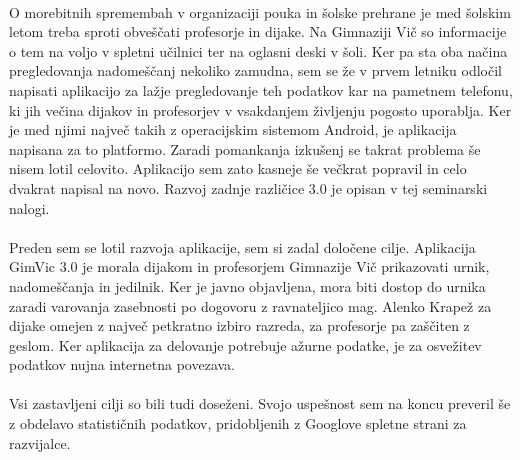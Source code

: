 \paragraph{}O morebitnih spremembah v organizaciji pouka in šolske prehrane je med šolskim letom treba sproti obveščati profesorje in dijake. Na Gimnaziji Vič so informacije o tem na voljo v spletni učilnici ter na oglasni deski v šoli. Ker pa sta oba načina pregledovanja nadomeščanj nekoliko zamudna, sem se že v prvem letniku odločil napisati aplikacijo za lažje pregledovanje teh podatkov kar na pametnem telefonu, ki jih večina dijakov in profesorjev v vsakdanjem življenju pogosto uporablja. Ker je med njimi največ takih z operacijskim sistemom Android\cite{android-wiki}, je aplikacija napisana za to platformo.  Zaradi pomankanja izkušenj se takrat problema še nisem lotil celovito. Aplikacijo sem zato kasneje še večkrat popravil in celo dvakrat napisal na novo. Razvoj zadnje različice 3.0 je opisan v tej seminarski nalogi.

\paragraph{} Preden sem se lotil razvoja aplikacije, sem si zadal določene cilje. Aplikacija GimVic 3.0 je morala dijakom in profesorjem Gimnazije Vič prikazovati urnik, nadomeščanja in jedilnik. Ker je javno objavljena, mora biti dostop do urnika zaradi varovanja zasebnosti po dogovoru z ravnateljico mag. Alenko Krapež za dijake omejen z največ petkratno izbiro razreda, za profesorje pa zaščiten z geslom. Ker aplikacija za delovanje potrebuje ažurne podatke, je za osvežitev podatkov nujna internetna povezava.

\paragraph{} Vsi zastavljeni cilji so bili tudi doseženi. Svojo uspešnost sem na koncu preveril še z obdelavo statističnih podatkov, pridobljenih z Googlove spletne strani za razvijalce.
